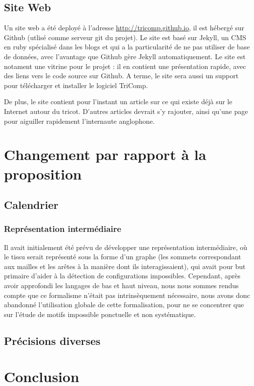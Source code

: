 \documentclass{article}
\begin{document}
\subsection{Site Web}

Un site web a été deployé à l'adresse \url{http://tricomp.github.io}, il est hébergé sur Github (utlisé comme serveur git du projet). Le site est basé sur Jekyll, un CMS en ruby spécialisé dans les blogs et qui a la particularité de ne pas utiliser de base de données, avec l'avantage que Github gère Jekyll automatiquement. Le site est notament une vitrine pour le projet : il en contient une présentation rapide, avec des liens vers le code source sur Github. A terme, le site sera aussi un support pour télécharger et installer le logiciel TriComp.

De plus, le site contient pour l'instant un article sur ce qui existe déjà sur le Internet autour du tricot. D'autres articles devrait s'y rajouter, ainsi qu'une page pour aiguiller rapidement l'internaute anglophone.

\section{Changement par rapport à la proposition}

\subsection{Calendrier}

\subsubsection{Représentation intermédiaire}

Il avait initialement été prévu de développer une représentation intermédiaire, où le tissu serait représenté sous la forme d'un graphe (les sommets 
correspondant aux mailles et les arêtes à la manière dont ils interagissaient), qui avait pour but primaire d'aider à la détection de configurations 
impossibles. Cependant, après avoir approfondi les langages de bas et haut niveau, nous nous sommes rendus compte que ce formalisme n'était pas 
intrinsèquement nécessaire, nous avons donc abandonné l'utilisation globale de cette formalisation, pour ne se concentrer que sur l'étude de motifs 
impossible ponctuelle et non systématique.

\subsection{Précisions diverses}

\section*{Conclusion}
\end{document}

